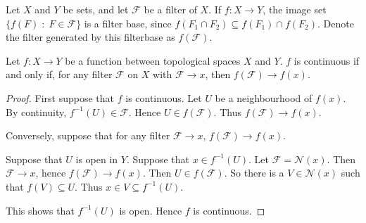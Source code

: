 \begin{definition}
    Let $X$ and $Y$ be sets, and let $\mathcal{F}$ be a filter of $X$.
    If $f:X\rightarrow Y$, the image set $\{f(F)\;:\;F \in \mathcal{F}\}$
    is a filter base, since $f(F_1\cap F_2) \subseteq f(F_1)\cap f(F_2)$. 
    Denote the filter generated by this filterbase as $f(\mathcal{F})$.
\end{definition}

\begin{proposition}
    Let $f:X\rightarrow Y$ be a function between topological spaces $X$ and $Y$.    
    $f$ is continuous if and only if, for any filter $\mathcal{F}$
    on $X$ with $\mathcal{F} \rightarrow x$, then $f(\mathcal{F}) \rightarrow f(x)$.
\end{proposition}
\begin{proof}
    First suppose that $f$ is continuous. Let $U$
    be a neighbourhood of $f(x)$. By continuity, $f^{-1}(U) \in \mathcal{F}$.
    Hence $U \in f(\mathcal{F})$. Thus $f(\mathcal{F}) \rightarrow f(x)$.

    Conversely, suppose that for any filter $\mathcal{F}\rightarrow x$,
    $f(\mathcal{F})\rightarrow f(x)$. 

    Suppose that $U$ is open in $Y$. Suppose that $x \in f^{-1}(U)$. 
    Let $\mathcal{F} = \mathcal{N}(x)$. Then $\mathcal{F}\rightarrow x$,
    hence $f(\mathcal{F})\rightarrow f(x)$. Then $U \in f(\mathcal{F})$. 
    So there is a $V \in \mathcal{N}(x)$ such that $f(V) \subseteq U$.
    Thus $x \in V \subseteq f^{-1}(U)$.

    This shows that $f^{-1}(U)$ is open. Hence $f$ is continuous.
\end{proof}

